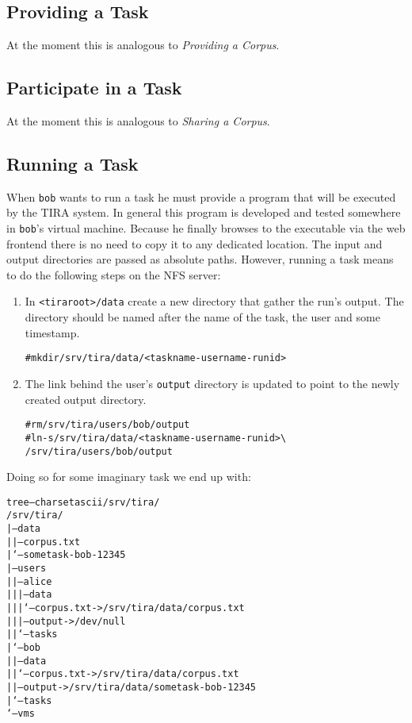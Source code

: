 \documentclass[12pt,a4paper,oneside,titlepage,draft]{report}
\newcommand{\tira}{TIRA\xspace}
\newenvironment{code}
  {\small\color{RubineRed}\begin{alltt}}
  {\end{alltt}}
\begin{document}
\subsection{Providing a Task}
At the moment this is analogous to \emph{Providing a Corpus}.

\subsection{Participate in a Task}
At the moment this is analogous to \emph{Sharing a Corpus}.

\subsection{Running a Task}
When \texttt{bob} wants to run a task he must provide a program that will be executed by the \tira system. In general this program is developed and tested somewhere in \texttt{bob}'s virtual machine. Because he finally browses to the executable via the web frontend there is no need to copy it to any dedicated location. The input and output directories are passed as absolute paths. However, running a task means to do the following steps on the NFS server:

\begin{enumerate}
\item In \texttt{<tiraroot>/data} create a new directory that gather the run's output. The directory should be named after the name of the task, the user and some timestamp.

\begin{code}
# mkdir /srv/tira/data/<taskname-username-runid>
\end{code}

\item The link behind the user's \texttt{output} directory is updated to point to the newly created output directory.

\begin{code}
# rm /srv/tira/users/bob/output
# ln -s /srv/tira/data/<taskname-username-runid> \textbackslash
  /srv/tira/users/bob/output
\end{code}
\end{enumerate}

\noindent
Doing so for some imaginary task we end up with:

\begin{code}
tree --charset ascii /srv/tira/
/srv/tira/
|-- data
|   |-- corpus.txt
|   `-- sometask-bob-12345
|-- users
|   |-- alice
|   |   |-- data
|   |   |   `-- corpus.txt -> /srv/tira/data/corpus.txt
|   |   |-- output -> /dev/null
|   |   `-- tasks
|   `-- bob
|       |-- data
|       |   `-- corpus.txt -> /srv/tira/data/corpus.txt
|       |-- output -> /srv/tira/data/sometask-bob-12345
|       `-- tasks
`-- vms
\end{code}
\end{document}
